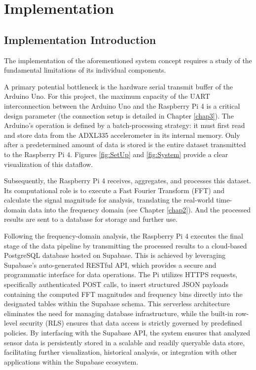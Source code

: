 
\chapter{Implementation}
\label{chap4}

\section{Implementation Introduction}
{
	The implementation of the aforementioned system concept requires a study of the fundamental limitations of its individual components.
	
	A primary potential bottleneck is the hardware serial transmit buffer of the Arduino Uno. For this project, the maximum capacity of the UART interconnection between the Arduino Uno and the Raspberry Pi 4 is a critical design parameter (the connection setup is detailed in Chapter \ref{chap3}). The Arduino's operation is defined by a batch-processing strategy: it must first read and store data from the ADXL335 accelerometer in its internal memory. Only after a predetermined amount of data is stored is the entire dataset transmitted to the Raspberry Pi 4. Figures \ref{fig:SetUp} and \ref{fig:System} provide a clear visualization of this dataflow.
	
	Subsequently, the Raspberry Pi 4 receives, aggregates, and processes this dataset. Its computational role is to execute a Fast Fourier Transform (FFT) and calculate the signal magnitude for analysis, translating the real-world time-domain data into the frequency domain (see Chapter \ref{chap2}). And the processed results are sent to a database for storage and further use. 
	
	Following the frequency-domain analysis, the Raspberry Pi 4 executes the final stage of the data pipeline by transmitting the processed results to a cloud-based PostgreSQL database hosted on Supabase. This is achieved by leveraging Supabase's auto-generated RESTful API, which provides a secure and programmatic interface for data operations. The Pi utilizes HTTPS requests, specifically authenticated POST calls, to insert structured JSON payloads containing the computed FFT magnitudes and frequency bins directly into the designated tables within the Supabase schema. This serverless architecture eliminates the need for managing database infrastructure, while the built-in row-level security (RLS) ensures that data access is strictly governed by predefined policies. By interfacing with the Supabase API, the system ensures that analyzed sensor data is persistently stored in a scalable and readily queryable data store, facilitating further visualization, historical analysis, or integration with other applications within the Supabase ecosystem.
	
}
